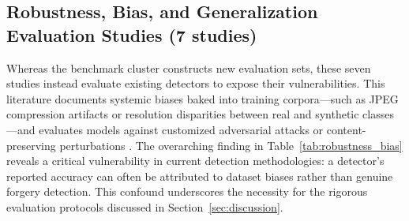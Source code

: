 \documentclass[sn-mathphys-num,Numbered,pdflatex]{sn-jnl}
\begin{document}
\subsection{Robustness, Bias, and Generalization Evaluation Studies (7 studies)}
Whereas the benchmark cluster constructs new evaluation sets, these seven studies instead evaluate existing detectors to expose their vulnerabilities. This literature documents systemic biases baked into training corpora—such as JPEG compression artifacts or resolution disparities between real and synthetic classes \cite{FakeOr35}—and evaluates models against customized adversarial attacks or content-preserving perturbations \cite{AnAnalysis36,AdversarialRobustness65,ComprehensiveEvaluation46}. The overarching finding in Table~\ref{tab:robustness_bias} reveals a critical vulnerability in current detection methodologies: a detector's reported accuracy can often be attributed to dataset biases rather than genuine forgery detection. This confound underscores the necessity for the rigorous evaluation protocols discussed in Section~\ref{sec:discussion}.
\end{document}
